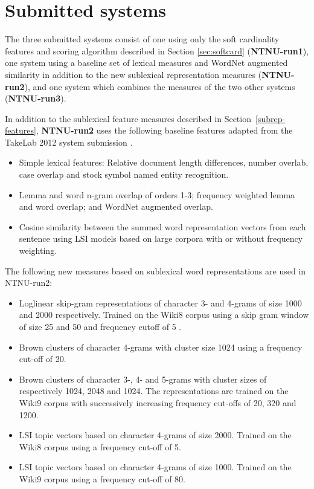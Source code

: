 
\section{Submitted systems}
\label{sec:systems}

The three submitted systems consist of one using only the soft cardinality features and scoring algorithm 
described in Section \ref{sec:softcard} ({\bf NTNU-run1}), 
one system using a baseline set of lexical measures and WordNet augmented similarity 
in addition to the new sublexical representation measures ({\bf NTNU-run2}), 
and one system which combines the measures of the two other systems ({\bf NTNU-run3}).

In addition to the sublexical feature measures described in Section~\ref{subrep-features},
{\bf NTNU-run2} uses the following baseline features adapted from the TakeLab 2012 system 
submission \cite{saric2012takelab}.

\begin{itemize}
\item Simple lexical features: Relative document length differences, number overlab, case overlap and stock symbol named entity recognition.
\item Lemma and word n-gram overlap of orders 1-3;
frequency weighted lemma and word overlap; and
WordNet augmented overlap.
\item Cosine similarity between the summed word representation vectors from each sentence using LSI models based on large corpora with or without frequency weighting.
\end{itemize}

The following new measures based on sublexical word representations are used in NTNU-run2:

\begin{itemize}
\item Loglinear skip-gram representations of character 3- and 4-grams of size 1000 and 2000 respectively. Trained on the Wiki8 corpus using a skip gram window of size 25 and 50 and frequency cutoff of 5 .
\item Brown clusters of character 4-grams with cluster size 1024 using a frequency cut-off of 20.
\item Brown clusters of character 3-, 4- and 5-grams with cluster sizes of respectively 1024, 2048 and 1024.
The representations are trained on the Wiki9 corpus with successively increasing frequency cut-offs of 20, 320 and 1200.
\item LSI topic vectors based on character 4-grams of size 2000.   Trained on the Wiki8 corpus using a frequency cut-off of 5.
\item LSI topic vectors based on character 4-grams of size 1000. Trained on the Wiki9 corpus using a frequency cut-off of 80.
\end{itemize}

